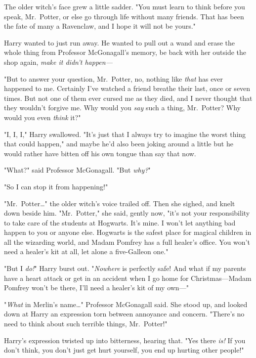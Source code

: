 The older witch's face grew a little sadder. "You must learn to think before 
you speak, Mr.~Potter, or else go through life without many friends. That has 
been the fate of many a Ravenclaw, and I hope it will not be yours."

Harry wanted to just run away. He wanted to pull out a wand and erase the whole 
thing from Professor McGonagall's memory, be back with her outside the shop 
again, \emph{make it didn't happen---}

"But to answer your question, Mr.~Potter, no, nothing like \emph{that} has ever 
happened to me. Certainly I've watched a friend breathe their last, once or 
seven times. But not one of them ever cursed me as they died, and I never 
thought that they wouldn't forgive me. Why would you \emph{say} such a thing, 
Mr.~Potter? Why would you even \emph{think} it?"

"I, I, I," Harry swallowed. "It's just that I always try to imagine the worst 
thing that could happen," and maybe he'd also been joking around a little but 
he would rather have bitten off his own tongue than say that now.

"What?" said Professor McGonagall. "But \emph{why?}"

"So I can stop it from happening!"

"Mr.~Potter{\ldots}" the older witch's voice trailed off. Then she sighed, and 
knelt down beside him. "Mr.~Potter," she said, gently now, "it's not your 
responsibility to take care of the students at Hogwarts. It's mine. I won't let 
anything bad happen to you or anyone else. Hogwarts is the safest place for 
magical children in all the wizarding world, and Madam Pomfrey has a full 
healer's office. You won't need a healer's kit at all, let alone a five-Galleon 
one."

"But I \emph{do!}" Harry burst out. "\emph{Nowhere} is perfectly safe! And what 
if my parents have a heart attack or get in an accident when I go home for 
Christmas---Madam Pomfrey won't be there, I'll need a healer's kit of my own---"

"\emph{What} in Merlin's name{\ldots}" Professor McGonagall said. She stood up, 
and looked down at Harry an expression torn between annoyance and concern. 
"There's no need to think about such terrible things, Mr.~Potter!"

Harry's expression twisted up into bitterness, hearing that. "Yes there 
\emph{is!} If you don't think, you don't just get hurt yourself, you end up 
hurting other people!"

